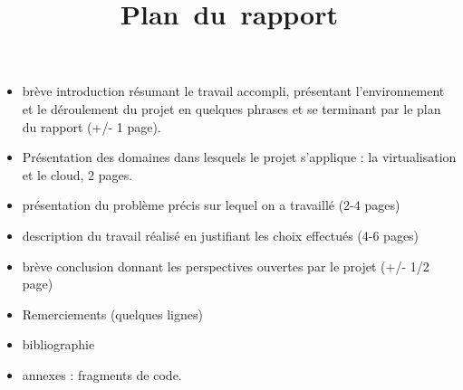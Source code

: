 \documentclass[12pt,a4paper]{article}
\title{Plan\ du\ rapport}
\begin{document}
\maketitle
\begin{itemize}
\item brève introduction résumant le travail accompli, présentant l'environnement et le déroulement du projet en quelques phrases et se terminant par le plan du rapport (+/- 1 page).
\item Présentation des domaines dans lesquels le projet s'applique : la virtualisation et le cloud, 2 pages.
\item présentation du problème précis sur lequel on a travaillé (2-4 pages)
\item description du travail réalisé en justifiant les choix effectués (4-6 pages)
\item brève conclusion donnant les perspectives ouvertes par le projet (+/- 1/2 page)
\item Remerciements (quelques lignes)
\item bibliographie
\item annexes : fragments de code.
\end{itemize}
\end{document}

